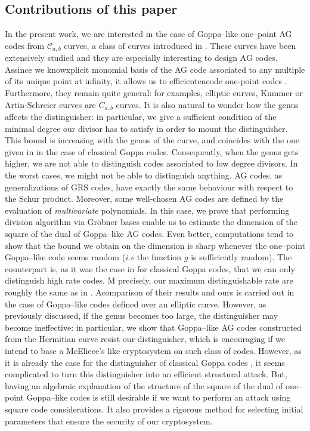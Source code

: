 \documentclass[a4paper]{amsart}
\theoremstyle{definition}
\theoremstyle{remark}
\newcommand{\calC}{\mathcal{C}}
\begin{document}
\subsection*{Contributions of this paper}
In the present work, we are interested in the case of Goppa--like one--point AG codes from $\calC_{a,b}$ curves, a class of curves introduced in \cite{Miu93}. These curves have been extensively studied and they are especially interesting to design AG codes. Assince we knowxplicit monomial basis of the AG code associated to any multiple of its unique point at infinity, it allows us to efficientencode one-point codes \cite{BRS21}. Furthermore, they remain quite general: for examples, elliptic curves, Kummer or Artin-Schreier curves are $C_{a,b}$ curves. It is also natural to wonder how the genus affects the distinguisher: in particular, we give a sufficient condition of the minimal degree our divisor has to satisfy in order to mount the distinguisher. This bound is increasing with the genus of the curve, and coincides with the one given in \cite{MT21} in the case of classical Goppa codes. Consequently, when the genus gets higher, we are not able to distinguish codes associated to low degree divisors. In the worst cases, we might not be able to distinguish anything.
AG codes, as generalizations of GRS codes, have exactly the same behaviour with respect to the Schur product. Moreover, some well-chosen AG codes are defined by the evaluation of \textit{multivariate} polynomials. In this case, we prove that performing division algorithm via Gr\"obner bases enable us to estimate the dimension of the square of the dual of Goppa--like AG codes. Even better, computations tend to show that the bound we obtain on the dimension is sharp whenever the one--point Goppa--like code seems random (\emph{i.e} the function $g$ is sufficiently random). The counterpart is, as it was the case in \cite{MT21} for classical Goppa codes, that we can only distinguish high rate codes. M precisely, our maximum distinguishable rate are roughly the same as in \cite{MT21}. Acomparison of their results and ours is carried out in the case of Goppa--like codes defined over an elliptic curve. However, as previously discussed, if the genus becomes too large, the distinguisher may become ineffective: in particular, we show that Goppa--like AG codes constructed from the Hermitian curve resist our distinguisher, which is encouraging if we intend to base a McEliece's like cryptosystem on such class of codes.
However, as it is already the case for the distinguisher of classical Goppa codes \cite{MT21}, it seems complicated to turn this distinguisher into an efficient structural attack. But, having an algebraic explanation of the structure of the square of the dual of one--point Goppa--like codes is still desirable if we want to perform an attack using square code considerations. It also provides a rigorous method for selecting initial parameters that ensure the security of our cryptosystem.
\end{document}
